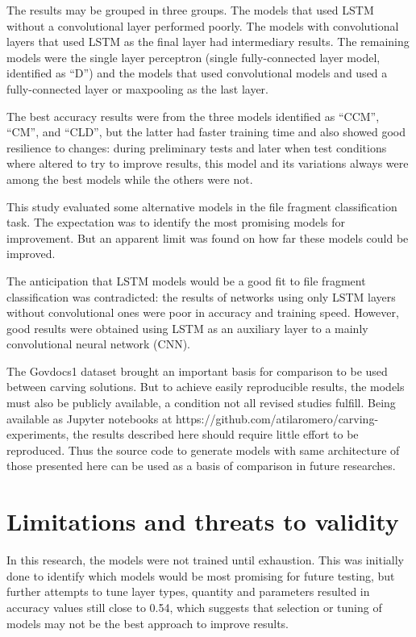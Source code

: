 The results may be grouped in three groups. The models that used LSTM without a convolutional layer performed poorly. The models with convolutional layers that used LSTM as the final layer had intermediary results. The remaining models were the single layer perceptron (single fully-connected layer model, identified as ``D'') and the models that used convolutional models and used a fully-connected layer or maxpooling as the last layer.

The best accuracy results were from the three models identified as ``CCM'', ``CM'', and ``CLD'', but the latter had faster training time and also showed good resilience to changes: during preliminary tests and later when test conditions where altered to try to improve results, this model and its variations always were among the best models while the others were not.

This study evaluated some alternative models in the file fragment classification task. The expectation was to identify the most promising models for improvement. But an apparent limit was found on how far these models could be improved. 

The anticipation that LSTM models would be a good fit to file fragment classification was contradicted: the results of networks using only LSTM layers without convolutional ones were poor in accuracy and training speed. However, good results were obtained using LSTM as an auxiliary layer to a mainly convolutional neural network (CNN). 

The Govdocs1 dataset brought an important basis for comparison to be used between carving solutions. But to achieve easily reproducible results, the models must also be publicly available, a condition not all revised studies fulfill. Being available as Jupyter notebooks at https://github.com/atilaromero/carving-experiments, the results described here should require little effort to be reproduced. Thus the source code to generate models with same architecture of those presented here can be used as a basis of comparison in future researches.

\section{Limitations and threats to validity}
In this research, the models were not trained until exhaustion. This was initially done to identify which models would be most promising for future testing, but further attempts to tune layer types, quantity and parameters resulted in accuracy values still close to 0.54, which suggests that selection or tuning of models may not be the best approach to improve results.

